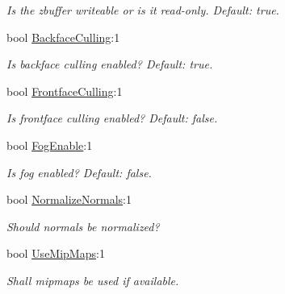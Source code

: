 \begin{DoxyCompactItemize}
\begin{DoxyCompactList}\small\item\em Is the zbuffer writeable or is it read-\/only. Default\+: true. \end{DoxyCompactList}\item 
\mbox{\label{classirr_1_1video_1_1SMaterial_af3fcfcd5c2042a699a3f6b45deac475e}} 
bool \hyperlink{classirr_1_1video_1_1SMaterial_af3fcfcd5c2042a699a3f6b45deac475e}{Backface\+Culling}\+:1
\begin{DoxyCompactList}\small\item\em Is backface culling enabled? Default\+: true. \end{DoxyCompactList}\item 
\mbox{\label{classirr_1_1video_1_1SMaterial_a9e0d15829ae99858ed8442582961149f}} 
bool \hyperlink{classirr_1_1video_1_1SMaterial_a9e0d15829ae99858ed8442582961149f}{Frontface\+Culling}\+:1
\begin{DoxyCompactList}\small\item\em Is frontface culling enabled? Default\+: false. \end{DoxyCompactList}\item 
\mbox{\label{classirr_1_1video_1_1SMaterial_aa361f179c15991ec85f0894cec38b880}} 
bool \hyperlink{classirr_1_1video_1_1SMaterial_aa361f179c15991ec85f0894cec38b880}{Fog\+Enable}\+:1
\begin{DoxyCompactList}\small\item\em Is fog enabled? Default\+: false. \end{DoxyCompactList}\item 
bool \hyperlink{classirr_1_1video_1_1SMaterial_aeee37deac57bebcd42650bc50aeccc2d}{Normalize\+Normals}\+:1
\begin{DoxyCompactList}\small\item\em Should normals be normalized? \end{DoxyCompactList}\item 
bool \hyperlink{classirr_1_1video_1_1SMaterial_a98aab3128696d9ad3f0f516153f7bae0}{Use\+Mip\+Maps}\+:1
\begin{DoxyCompactList}\small\item\em Shall mipmaps be used if available. \end{DoxyCompactList}\end{DoxyCompactItemize}


